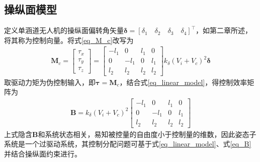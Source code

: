 \subsection{操纵面模型}
定义单涵道无人机的操纵面偏转角矢量$\bm{\delta } = [\delta_1 \quad \delta_2 \quad \delta_3 \quad \delta_4]^\top$，如第二章所述，将其称为控制向量。将式\eqref{eq_M_c}改写为
\begin{align}
\bm{M}_{c}=\begin{bmatrix} \tau_{x} \\ \tau_{y} \\ \tau_{z} \end{bmatrix}=\begin{bmatrix}
-l_{1} & 0 & l_{1} & 0 \\
0 & -l_{1} & 0 & l_{1} \\
l_{2} & l_{2} & l_{2} & l_{2}
\end{bmatrix} k_{\delta} (V_i+V_c)^2 \bm{\delta}
\end{align}
取驱动力矩为伪控制输入，即$\bm{\tau } =\bm{M}_{c}$，结合式\eqref{eq_linear_model}，得控制效率矩阵为
\begin{align}
\bm{B}=k_{\delta}(V_i+V_c)^2\begin{bmatrix}
-l_{1} & 0 & l_{1} & 0 \\
0 & -l_{1} & 0 & l_{1} \\
l_{2} & l_{2} & l_{2} & l_{2}
\end{bmatrix}
\label{eq_B}
\end{align}	
上式隐含$\bm{B}$和系统状态相关，易知被控量的自由度小于控制量的维数，因此姿态子系统是一个过驱动系统，其控制分配问题可基于式\eqref{eq_linear_model}、式\eqref{eq_B}并结合操纵面约束进行。


%

